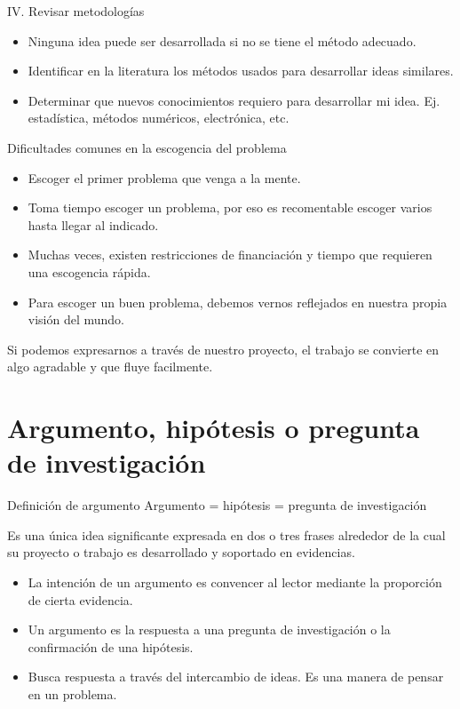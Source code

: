 \documentclass [xcolor=svgnames, t] {beamer}
\begin{document}
\begin{frame}{IV. Revisar metodolog\'ias}
\begin{itemize}
\item Ninguna idea puede ser desarrollada si no se tiene el m\'etodo adecuado. 
\item Identificar en la literatura los m\'etodos usados para desarrollar ideas similares.
\item Determinar que nuevos conocimientos requiero para desarrollar mi idea. Ej. estad\'istica, m\'etodos num\'ericos, electr\'onica, etc.
\end{itemize}
\end{frame}


\begin{frame}{Dificultades comunes en la escogencia del problema}
\begin{itemize}
\item Escoger el primer problema que venga a la mente.
\item Toma tiempo escoger un problema, por eso es recomentable escoger varios hasta llegar al indicado.
\item Muchas veces, existen restricciones de financiaci\'on y tiempo que requieren una escogencia r\'apida.
\item Para escoger un buen problema, debemos vernos reflejados en nuestra propia visi\'on del mundo. 
\end{itemize}
\centering
\alert{Si podemos expresarnos a trav\'es de nuestro proyecto, el trabajo se convierte en algo agradable y que fluye facilmente.}
\end{frame}

\section{Argumento, hip\'otesis o pregunta de investigaci\'on}
\begin{frame}{Definici\'on de argumento}
Argumento = hip\'otesis = pregunta de investigaci\'on
\begin{exampleblock}
Es una \'unica idea significante expresada en dos o tres frases alrededor de la cual su proyecto o trabajo es desarrollado y soportado en evidencias.
\end{exampleblock}
\begin{itemize}
\item La intenci\'on de un argumento es convencer al lector mediante la proporci\'on de cierta evidencia.
\item Un argumento es la respuesta a una pregunta de investigaci\'on o la confirmaci\'on de una hip\'otesis.
\item Busca respuesta a trav\'es del intercambio de ideas. Es una manera de pensar en un problema. 
\end{itemize}
\end{frame}
\end{document}
